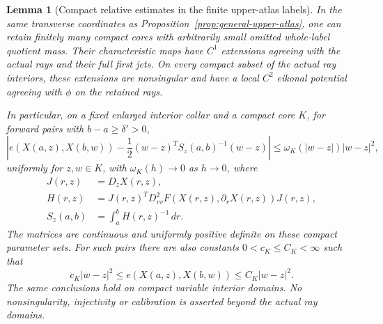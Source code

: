 \documentclass[11pt,reqno]{amsart}
\newtheorem{lemma}[theorem]{Lemma}
\theoremstyle{definition}
\theoremstyle{remark}
\numberwithin{equation}{section}
\begin{document}
\begin{lemma}[Compact relative estimates in the finite upper-atlas labels]
\label{general-gluing-compatible-cores}
In the same transverse coordinates as
Proposition~\ref{prop:general-upper-atlas}, one can retain finitely many
compact cores with arbitrarily small omitted whole-label quotient mass.
Their characteristic maps have \(C^1\) extensions agreeing with the actual
rays and their full first jets. On every compact subset of the actual ray
interiors, these extensions are nonsingular and have a local \(C^2\)
eikonal potential agreeing with \(\phi\) on the retained rays.

In particular, on a fixed enlarged interior collar and a compact core
\(K\), for forward pairs with \(b-a\ge\delta'>0\),
\begin{equation}
\label{general-gluing-relative-expansion}
 \left|e(X(a,z),X(b,w))-\frac12(w-z)^T S_z(a,b)^{-1}(w-z)\right|
 \le\omega_K(|w-z|)|w-z|^2,
\end{equation}
uniformly for \(z,w\in K\), with \(\omega_K(h)\to0\) as
\(h\to0\), where
\begin{equation}
\label{general-gluing-local-compliance}
 \begin{split}
 J(r,z)&=D_zX(r,z),\\
 H(r,z)&=J(r,z)^TD_{vv}^2F(X(r,z),\partial_rX(r,z))J(r,z),\\
 S_z(a,b)&=\int_a^b H(r,z)^{-1}\,dr.
 \end{split}
\end{equation}
The matrices are continuous and uniformly positive definite on these
compact parameter sets. For such pairs there are also constants
\(0<c_K\le C_K<\infty\) such that
\begin{equation}
\label{general-gluing-core-coercivity}
 c_K|w-z|^2\le e(X(a,z),X(b,w))\le C_K|w-z|^2.
\end{equation}
The same conclusions hold on compact variable interior domains. No
nonsingularity, injectivity or calibration is asserted beyond the actual
ray domains.
\end{lemma}
\end{document}
